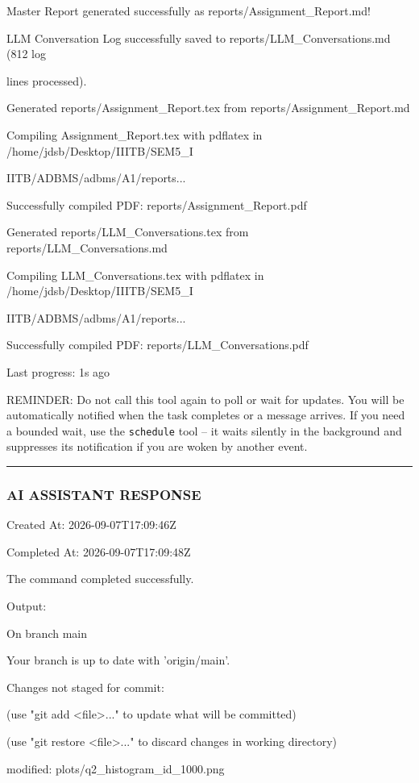 \documentclass[11pt,a4paper]{article}
\begin{document}
Master Report generated successfully as reports/Assignment\_Report.md!

LLM Conversation Log successfully saved to reports/LLM\_Conversations.md (812 log

lines processed).

Generated reports/Assignment\_Report.tex from reports/Assignment\_Report.md

Compiling Assignment\_Report.tex with pdflatex in /home/jdsb/Desktop/IIITB/SEM5\_I

IITB/ADBMS/adbms/A1/reports...

Successfully compiled PDF: reports/Assignment\_Report.pdf

Generated reports/LLM\_Conversations.tex from reports/LLM\_Conversations.md

Compiling LLM\_Conversations.tex with pdflatex in /home/jdsb/Desktop/IIITB/SEM5\_I

IITB/ADBMS/adbms/A1/reports...

Successfully compiled PDF: reports/LLM\_Conversations.pdf


Last progress: 1s ago



REMINDER: Do not call this tool again to poll or wait for updates. You will be automatically notified when the task completes or a message arrives. If you need a bounded wait, use the \texttt{schedule} tool -- it waits silently in the background and suppresses its notification if you are woken by another event.


\hrule

\subsubsection{AI ASSISTANT RESPONSE}

Created At: 2026-09-07T17:09:46Z

Completed At: 2026-09-07T17:09:48Z


The command completed successfully.

Output:

On branch main

Your branch is up to date with 'origin/main'.


Changes not staged for commit:

(use "git add <file>..." to update what will be committed)

(use "git restore <file>..." to discard changes in working directory)

modified:   plots/q2\_histogram\_id\_1000.png
\end{document}
